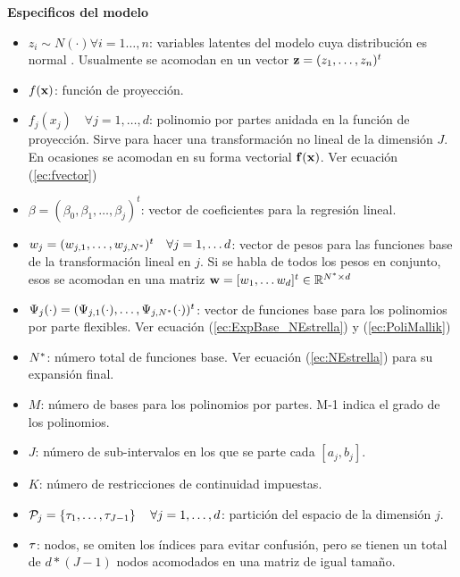 \documentclass[../../Main/Main.tex]{subfiles}
\begin{document}
\textbf{Especificos del modelo}
\begin{itemize}[label={}]

	\item $z_i \sim N(\cdot) \forall i = 1\ldots,n$: variables latentes del modelo cuya distribución es normal . Usualmente se acomodan en un vector $\mathbf{z} = (z_1,\ldots,z_n)^t$ 
	\item $f(\mathbf{x})$: función de proyección. 
	\item $f_j(x_j) \quad \forall j = 1,\ldots,d$: polinomio por partes anidada en la función de proyección. Sirve para hacer una transformación no lineal de la dimensión $J$. En ocasiones se acomodan en su forma vectorial $\mathbf{f}(\mathbf{x})$. Ver ecuación (\ref{ec:fvector})
	\item $\beta = (\beta_0, \beta_1,\ldots,\beta_j)^t$: vector de coeficientes para la regresión lineal.
	\item $w_j = (w_{j,1},\ldots,w_{j,N^*})^t \quad \forall j = 1,\ldots d$: vector de pesos para las funciones base de la transformación lineal en $j$. Si se habla de todos los pesos en conjunto, esos se acomodan en una matriz $\mathbf{w} = [w_1,\ldots w_d]^t \in \mathbb{R}^{N^*\times d}$
	\item $\Psi_j(\cdot) = (\Psi_{j,1}(\cdot),\ldots,\Psi_{j,N^*}(\cdot))^t$: vector de funciones base para los polinomios por parte flexibles. Ver ecuación (\ref{ec:ExpBase_NEstrella}) y (\ref{ec:PoliMallik})
	\item $N^*$: número total de funciones base. Ver ecuación (\ref{ec:NEstrella}) para su expansión final. 
	\item $M$: número de bases para los polinomios por partes. M-1 indica el grado de los polinomios.
	\item $J$: número de sub-intervalos en los que se parte cada $[a_j,b_j]$. 
	\item $K$: número de restricciones de continuidad impuestas. 
	\item $\mathcal{P}_j = \left\{\tau_1,\ldots,\tau_{J-1}\right\} \quad \forall j = 1,\ldots,d$: partición del espacio de la dimensión $j$.
	\item $\tau$: nodos, se omiten los índices para evitar confusión, pero se tienen un total de $d*(J-1)$ nodos acomodados en una matriz de igual tamaño.
\end{itemize}
\end{document}
